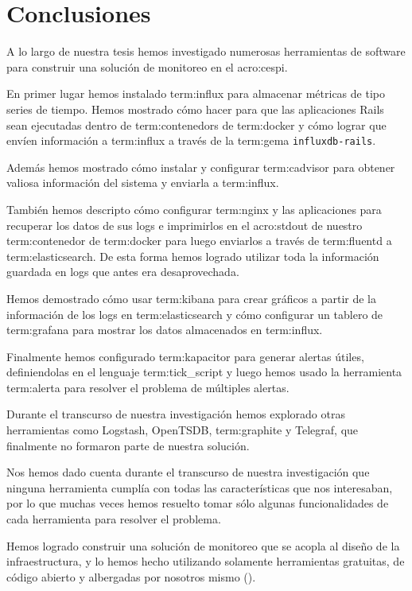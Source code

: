 \newpage
\section{Conclusiones}
\label{conclusiones}

A lo largo de nuestra tesis hemos investigado numerosas herramientas de
software para construir una solución de monitoreo en el \gls{acro:cespi}.

En primer lugar hemos instalado \gls{term:influx} para almacenar métricas de
tipo series de tiempo. Hemos mostrado cómo hacer para que las aplicaciones
Rails sean ejecutadas dentro de \glspl{term:contenedor} de \gls{term:docker} y cómo lograr
que envíen información a \gls{term:influx} a través de la \gls{term:gema}
\texttt{influxdb-rails}.

Además hemos mostrado cómo instalar y configurar \gls{term:cadvisor} para
obtener valiosa información del sistema y enviarla a \gls{term:influx}.

También hemos descripto cómo configurar \gls{term:nginx} y las aplicaciones
para recuperar los datos de sus logs e imprimirlos en el \gls{acro:stdout} de
nuestro \gls{term:contenedor} de \gls{term:docker} para luego enviarlos a través de
\gls{term:fluentd} a \gls{term:elasticsearch}. De esta forma hemos logrado
utilizar toda la información guardada en logs que antes era desaprovechada.

Hemos demostrado cómo usar \gls{term:kibana} para crear gráficos a partir de la
información de los logs en \gls{term:elasticsearch} y cómo configurar un tablero de
\gls{term:grafana} para mostrar los datos almacenados en \gls{term:influx}.

Finalmente hemos configurado \gls{term:kapacitor} para generar alertas útiles,
definiendolas en el lenguaje \gls{term:tick_script} y luego hemos usado la
herramienta \gls{term:alerta} para resolver el problema de múltiples alertas.

Durante el transcurso de nuestra investigación hemos explorado otras
herramientas como Logstash, OpenTSDB, \gls{term:graphite} y Telegraf, que finalmente no
formaron parte de nuestra solución.

Nos hemos dado cuenta durante el transcurso de nuestra investigación que
ninguna herramienta cumplía con todas las características que nos interesaban,
por lo que muchas veces hemos resuelto tomar sólo algunas funcionalidades de
cada herramienta para resolver el problema.

Hemos logrado construir una solución de monitoreo que se acopla al diseño de la
infraestructura, y lo hemos hecho utilizando solamente herramientas gratuitas,
de código abierto y albergadas por nosotros mismo ().

